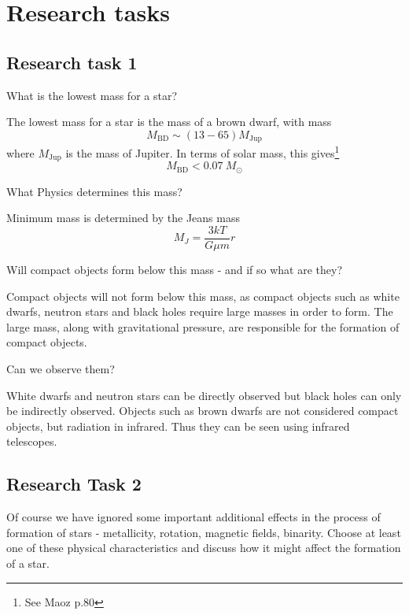 \documentclass[a4paper]{article} %
\newcommand{\ms}[1]{\SI{#1}{M_{\odot}}}
\begin{document}
\section{Research tasks}
\subsection{Research task 1}
\begin{framed}
What is the lowest mass for a star? 
\end{framed}

The lowest mass for a star is the mass of a brown dwarf, with mass
\begin{equation*}
M_{\text{BD}}\sim (13 - 65) \si{M_{\text{Jup}}}
\end{equation*}
where $\si{M_{\text{Jup}}}$ is the mass of Jupiter. In terms of solar mass, this gives\footnote{See Maoz p.80}
\begin{equation*}
M_{\text{BD}} < \ms{0.07}
\end{equation*}

\begin{framed}
What Physics determines this mass?
\end{framed}

Minimum mass is determined by the Jeans mass
\begin{equation*}
M_J=\frac{3kT}{G\mu m}r
\end{equation*}


\begin{framed}
Will compact objects form below this mass - and if so what are they?
\end{framed}

Compact objects will not form below this mass, as compact objects such as white dwarfs, neutron stars and black holes require large masses in order to form. The large mass, along with gravitational pressure, are responsible for the formation of compact objects.

\begin{framed}
Can we observe them?
\end{framed}
White dwarfs and neutron stars can be directly observed but black holes can only be indirectly observed. Objects such as brown dwarfs are not considered compact objects, but radiation in infrared. Thus they can be seen using infrared telescopes.

\pagebreak

\subsection{Research Task 2}
\begin{framed}
Of course we have ignored some important additional effects in the process of formation of stars - metallicity, rotation, magnetic fields, binarity. Choose at least one of these physical characteristics and discuss how it might affect the formation of a star.
\end{framed}
\end{document}
